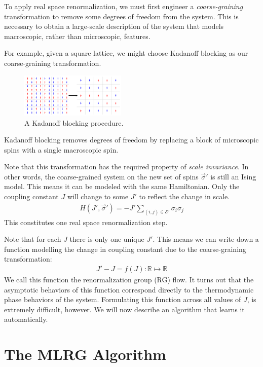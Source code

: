 \documentclass[%
    reprint,
    amsmath,amssymb,
    aps,
]{revtex4-2}
\begin{document}
To apply real space renormalization, we must first engineer a \textit{coarse-graining} transformation to remove some degrees of freedom from the system. 
This is necessary to obtain a large-scale description of the system that models macroscopic, rather than microscopic, features. 

For example, given a square lattice, we might choose Kadanoff blocking \cite{kadanoff-blocking} as our coarse-graining transformation. 
\begin{figure}[h]
    \includegraphics[width=0.45\textwidth]{tex/images/ising-blocking.png}
    \caption{\label{fig:kadanoff}
        A Kadanoff blocking procedure. 
    }
\end{figure}
Kadanoff blocking removes degrees of freedom by replacing a block of microscopic spins with a single macroscopic spin. 

Note that this transformation has the required property of \textit{scale invariance}. 
In other words, the coarse-grained system on the new set of spins $\vec{\sigma}'$ is still an Ising model. 
This means it can be modeled with the same Hamiltonian. 
Only the coupling constant $J$ will change to some $J'$ to reflect the change in scale. 
\begin{eqnarray}
    \label{eqn:ising-prime-hamiltonian}
    H(J', \vec{\sigma}') = -J' \sum_{(i, j) \in \mathcal{E'}} \sigma_i \sigma_j
\end{eqnarray}
This constitutes one real space renormalization step. 

Note that for each $J$ there is only one unique $J'$. 
This means we can write down a function modelling the change in coupling constant due to the coarse-graining transformation:
\begin{eqnarray}
    \label{eqn:rg-flow}
    J' - J = f(J) : \mathbb{R} \mapsto \mathbb{R}
\end{eqnarray}
We call this function the renormalization group (RG) flow. 
It turns out that the asymptotic behaviors of this function correspond directly to the thermodynamic phase behaviors of the system. 
Formulating this function across all values of $J$, is extremely difficult, however. 
We will now describe an algorithm that learns it automatically. 

\section{The MLRG Algorithm} \label{sec:mlrg}
\end{document}
